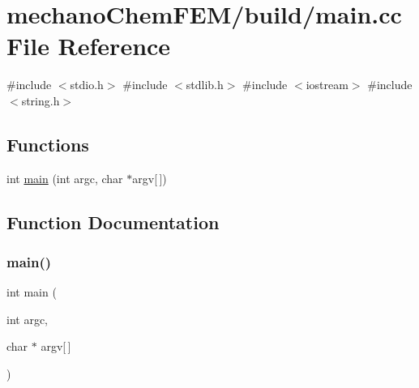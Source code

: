\section{mechano\+Chem\+F\+E\+M/build/main.cc File Reference}
\label{main_8cc}
{\ttfamily \#include $<$stdio.\+h$>$}\newline
{\ttfamily \#include $<$stdlib.\+h$>$}\newline
{\ttfamily \#include $<$iostream$>$}\newline
{\ttfamily \#include $<$string.\+h$>$}\newline
\subsection*{Functions}
\begin{DoxyCompactItemize}
\item 
int \mbox{\hyperlink{main_8cc_a0ddf1224851353fc92bfbff6f499fa97}{main}} (int argc, char $\ast$argv\mbox{[}$\,$\mbox{]})
\end{DoxyCompactItemize}


\subsection{Function Documentation}
\mbox{\label{main_8cc_a0ddf1224851353fc92bfbff6f499fa97}} 
\subsubsection{\texorpdfstring{main()}{main()}}
{\footnotesize\ttfamily int main (\begin{DoxyParamCaption}\item[{int}]{argc,  }\item[{char $\ast$}]{argv\mbox{[}$\,$\mbox{]} }\end{DoxyParamCaption})}

